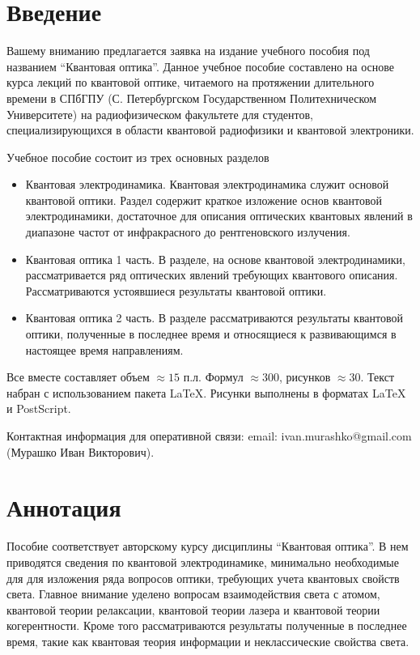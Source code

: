 


\Russian


\section*{Введение}
Вашему вниманию предлагается заявка на издание учебного пособия под
названием ``Квантовая оптика''. Данное учебное пособие составлено на
основе курса лекций по квантовой оптике, читаемого на 
протяжении длительного времени в СПбГПУ (С. Петербургском
Государственном Политехническом Университете) на радиофизическом
факультете для студентов, специализирующихся в области квантовой
радиофизики и квантовой электроники.

Учебное пособие состоит из трех основных разделов
\begin{itemize}
\item Квантовая электродинамика. Квантовая электродинамика служит
  основой квантовой оптики. Раздел 
содержит краткое изложение основ квантовой электродинамики,
достаточное для описания оптических квантовых явлений в диапазоне
частот от инфракрасного до рентгеновского излучения.
\item Квантовая оптика 1 часть. В разделе, на основе квантовой
  электродинамики, рассматривается ряд оптических явлений требующих
  квантового описания. Рассматриваются устоявшиеся результаты
  квантовой оптики.
\item Квантовая оптика 2 часть. В разделе рассматриваются результаты
  квантовой оптики, полученные в последнее время и относящиеся к
  развивающимся в настоящее время направлениям.
\end{itemize}
Все вместе составляет объем \(\approx 15\) п.л. Формул \(\approx
300\), рисунков \(\approx 30\). Текст
набран с использованием пакета \LaTeX. Рисунки выполнены в
форматах {\LaTeX} и PostScript.

Контактная информация для оперативной связи: email:
ivan.murashko@gmail.com (Мурашко Иван Викторович). 

\section{Аннотация}
Пособие соответствует авторскому курсу дисциплины ``Квантовая
оптика''. В нем приводятся сведения по квантовой электродинамике,
минимально необходимые для для изложения ряда вопросов оптики,
требующих учета квантовых свойств света. Главное внимание уделено
вопросам взаимодействия света с атомом, квантовой теории релаксации,
квантовой теории лазера и квантовой теории когерентности. Кроме того
рассматриваются результаты полученные в последнее время, такие как
квантовая теория информации и неклассические свойства света.

